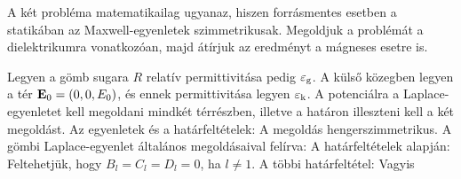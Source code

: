    A két probléma matematikailag ugyanaz, hiszen forrásmentes esetben a statikában az Maxwell-egyenletek szimmetrikusak. Megoldjuk a problémát a dielektrikumra vonatkozóan, majd átírjuk az eredményt a mágneses esetre is. 
   
   Legyen a gömb sugara $R$ relatív permittivitása pedig $\varepsilon_\text{g}$. A külső közegben legyen a tér $\mathbf{E}_0=(0,0,E_0)$, és ennek permittivitása legyen $\varepsilon_\text{k}$. A potenciálra a Laplace-egyenletet kell megoldani mindkét térrészben, illetve a határon illeszteni kell a két megoldást. Az egyenletek és a határfeltételek:
   A megoldás hengerszimmetrikus. A gömbi Laplace-egyenlet általános megoldásaival felírva:
   A határfeltételek alapján:
   Feltehetjük, hogy $B_l=C_l=D_l=0$, ha $l\ne 1$. A többi határfeltétel:
   Vagyis
   
